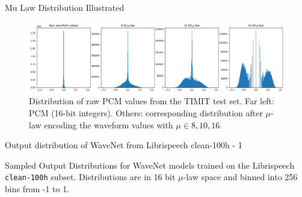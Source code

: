 \documentclass[
  ignorenonframetext,
  aspectratio=169,
]{beamer}
\begin{document}
\begin{frame}{Mu Law Distribution Illustrated}
\protect\hypertarget{mu-law-distribution-illustrated}{}
\begin{figure}[ht]
    \centering
    \includegraphics[width=\columnwidth]{mu_law.png}
    \caption{
    Distribution of raw PCM values from the TIMIT test set. Far left: PCM (16-bit integers). Others: corresponding distribution after $\mu$-law encoding the waveform values with $\mu \in {8,10,16}$.
    }
\end{figure}
\end{frame}

\begin{frame}[fragile]{Output distribution of WaveNet from Librispeech
clean-100h - 1}
\protect\hypertarget{output-distribution-of-wavenet-from-librispeech-clean-100h---1}{}
\begin{figure}
\end{figure}

Sampled Output Distributions for WaveNet models trained on the
Librispeech \texttt{clean-100h} subset. Distributions are in 16 bit
\(\mu\)-law space and binned into 256 bins from -1 to 1.
\end{frame}
\end{document}
